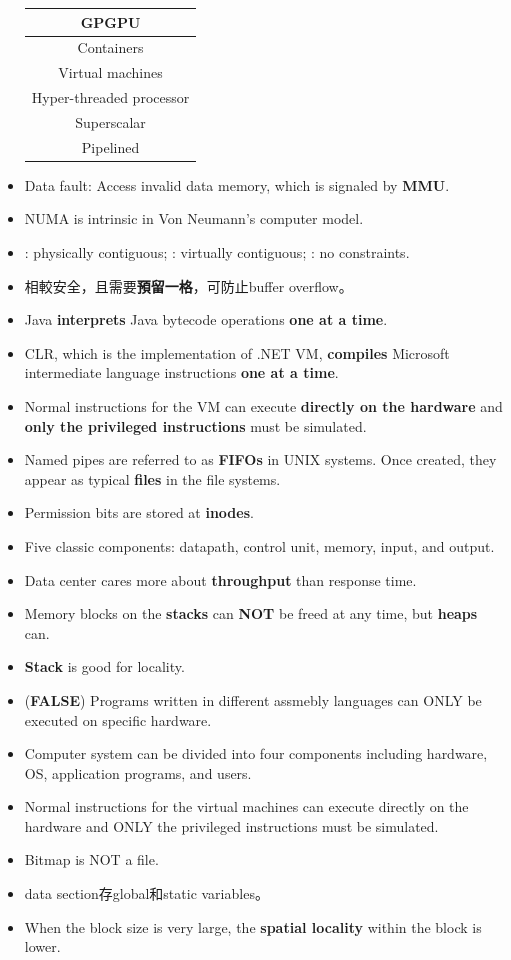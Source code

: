 \begin{itemize}
\begin{table}[H]
\begin{tabular}{|c|}
            GPGPU \\
            \hline
            Containers \\
            \hline
            Virtual machines \\
            \hline
            Hyper-threaded processor \\
            \hline
            Superscalar \\
            \hline
            Pipelined \\
            \hline
        \end{tabular}
    \end{table}
    \item Data fault: Access invalid data memory, which is signaled by \textbf{MMU}.
    \item NUMA is intrinsic in Von Neumann's computer model.
    \item {}: physically contiguous; : virtually contiguous; : no constraints.
    \item {}相較安全，且需要\textbf{預留一格}，可防止buffer overflow。
    \item Java \textbf{interprets} Java bytecode operations \textbf{one at a time}.
    \item CLR, which is the implementation of .NET VM, \textbf{compiles} Microsoft intermediate language instructions \textbf{one at a time}.
    \item Normal instructions for the VM can execute \textbf{directly on the hardware} and \textbf{only the privileged instructions} must be simulated.
    \item Named pipes are referred to as \textbf{FIFOs} in UNIX systems. Once created, they appear as typical \textbf{files} in the file systems. 
    \item Permission bits are stored at \textbf{inodes}.
    \item Five classic components: datapath, control unit, memory, input, and output.
    \item Data center cares more about \textbf{throughput} than response time.
    \item Memory blocks on the \textbf{stacks} can \textbf{NOT} be freed at any time, but \textbf{heaps} can.
    \item \textbf{Stack} is good for locality.
    \item (\textbf{FALSE}) Programs written in different assmebly languages can ONLY be executed on specific hardware.
    \item Computer system can be divided into four components including hardware, OS, application programs, and users.  
    \item Normal instructions for the virtual machines can execute directly on the hardware and ONLY the privileged instructions must be simulated.
    \item Bitmap is NOT a file.
    \item data section存global和static variables。
    \item When the block size is very large, the \textbf{spatial locality} within the block is lower.
\end{itemize}

\pagebreak
